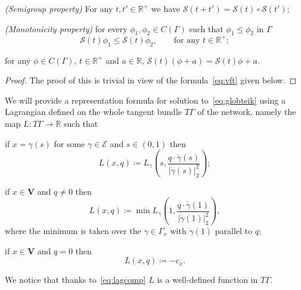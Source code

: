 \documentclass[11pt,a4paper,american]{article}
\newcommand{\Ecal}{\mathcal E}
\newcommand{\Rds}{\mathds R}
\newcommand{\Scal}{\mathcal S}
\newcommand{\Vbf}{\mathbf V}
\begin{document}
    \begin{prop}\label{Scalprop}\leavevmode
        \begin{myenum}
            \item\emph{(Semigroup property)} For any $t,t'\in\Rds^+$ we have $\Scal(t+t')=\Scal(t)\circ\Scal(t')$;
            \item\emph{(Monotonicity property)} for every $\phi_1,\phi_2\in C(\Gamma)$ such that $\phi_1\le\phi_2$ in $\Gamma$
            \begin{equation*}
                \Scal(t)\phi_1\le\Scal(t)\phi_2,\qquad\text{for any }t\in\Rds^+;
            \end{equation*}
            \item for any $\phi\in C(\Gamma)$, $t\in\Rds^+$ and $a\in\Rds$, $\Scal(t)(\phi+a)=\Scal(t)\phi+a$.
        \end{myenum}
    \end{prop}
    \begin{proof}
        The proof of this  is trivial in view of the formula~\cref{eq:vft} given below.
    \end{proof}

    We will provide a representation formula for solution to~\cref{eq:globteik} using a Lagrangian defined on the whole tangent bundle $T\Gamma$ of the network, namely the map $L:T\Gamma\to\Rds$ such that
    \begin{mylist}
        \item if $x=\gamma(s)$ for some $\gamma\in\Ecal$ and $s\in(0,1)$ then
        \begin{equation*}
            L(x,q)\coloneqq L_\gamma\left(s,\frac{q\cdot\dot\gamma(s)}{|\dot\gamma(s)|_2^2}\right);
        \end{equation*}
        \item if $x\in\Vbf$ and $q\ne0$ then
        \begin{equation*}
            L(x,q)\coloneqq\min L_\gamma\left(1,\frac{q\cdot\dot\gamma(1)}{|\dot\gamma(1)|_2^2}\right),
        \end{equation*}
        where the minimum is taken over the $\gamma\in\Gamma_x$ with $\dot\gamma(1)$ parallel to $q$;
        \item if $x\in\Vbf$ and $q=0$ then
        \begin{equation*}
            L(x,q)\coloneqq-c_x.
        \end{equation*}
    \end{mylist}
    We notice that thanks to~\cref{eq:lagcomp} $L$ is a well-defined function in $T\Gamma$.
\end{document}
